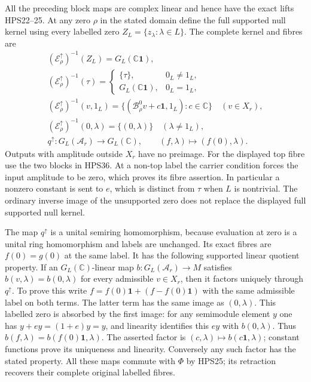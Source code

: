 All the preceding block maps are complex
linear and hence have the exact lifts
HPS22--25. At any zero $\rho$ in the
stated domain define the full supported
null kernel using every labelled zero
$Z_L=\{z_\lambda:\lambda\in L\}$.
The complete kernel and fibres are
\begin{equation}\tag{HPS39}
\begin{gathered}
 (\mathscr E_\rho^\uparrow)^{-1}(Z_L)
               =G_L(\mathbb C\mathbf1),\\
 (\mathscr E_\rho^\uparrow)^{-1}(\tau)
 =\begin{cases}
     \{\tau\},&0_L\ne1_L,\\
     G_L(\mathbb C\mathbf1),&0_L=1_L,
   \end{cases}\\
 (\mathscr E_\rho^\uparrow)^{-1}(v,1_L)
   =\{(\mathcal B_\rho^0v+c\mathbf1,1_L):c\in\mathbb C\}
                                   \quad(v\in X_r),\\
 (\mathscr E_\rho^\uparrow)^{-1}(0,\lambda)
                   =\{(0,\lambda)\}\quad(\lambda\ne1_L),\\
 q^\uparrow:G_L(\mathcal A_r)\longrightarrow G_L(\mathbb C),
       \qquad(f,\lambda)\longmapsto(f(0),\lambda).
\end{gathered}
\end{equation}
Outputs with amplitude outside $X_r$
have no preimage. For the displayed
top fibre use the two blocks in
HPS36. At a non-top label the
carrier condition forces the
input amplitude to be zero,
which proves its fibre assertion.
In particular a nonzero constant
is sent to $e$, which is distinct
from $\tau$ when $L$ is nontrivial.
The ordinary inverse image of the
unsupported zero does not replace
the displayed full supported
null kernel.

The map $q^\uparrow$ is a unital
semiring homomorphism, because
evaluation at zero is a unital
ring homomorphism and labels
are unchanged. Its exact fibres
are $f(0)=g(0)$ at the same label.
It has the following supported
linear quotient property.
If an $G_L(\mathbb C)$-linear map
$b:G_L(\mathcal A_r)\to M$ satisfies
$b(v,\lambda)=b(0,\lambda)$
for every admissible $v\in X_r$,
then it factors uniquely through
$q^\uparrow$. To prove this write
$f=f(0)\mathbf1+(f-f(0)\mathbf1)$
with the same admissible label
on both terms. The latter term
has the same image as $(0,\lambda)$.
This labelled zero is absorbed
by the first image: for any
semimodule element $y$ one has
$y+ey=(1+e)y=y$, and linearity
identifies this $ey$ with
$b(0,\lambda)$.
Thus $b(f,\lambda)=b(f(0)\mathbf1,\lambda)$.
The asserted factor is
$(c,\lambda)\mapsto b(c\mathbf1,\lambda)$;
constant functions prove its
uniqueness and linearity.
Conversely any such factor
has the stated property.
All these maps commute with
$\Phi$ by HPS25; its retraction
recovers their complete original
labelled fibres.

